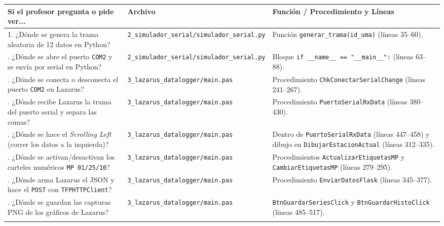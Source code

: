 \documentclass[11pt,a4paper]{article}
\begin{document}
\begin{table}[h!]
\centering
\small
\begin{tabular}{@{}p{5.8cm}p{4.6cm}p{5.2cm}@{}}
\toprule
\textbf{Si el profesor pregunta o pide ver...} & \textbf{Archivo} & \textbf{Función / Procedimiento y Líneas} \\ \midrule
1. ¿Dónde se genera la trama aleatoria de 12 datos en Python? & \texttt{2\_simulador\_serial/\newline simulador\_serial.py} & Función \texttt{generar\_trama(id\_uma)} (líneas 35--60). \\ \addlinespace
2. ¿Dónde se abre el puerto \texttt{COM2} y se envía por serial en Python? & \texttt{2\_simulador\_serial/\newline simulador\_serial.py} & Bloque \texttt{if \_\_name\_\_ == "\_\_main\_\_":} (líneas 63--88). \\ \addlinespace
3. ¿Dónde se conecta o desconecta el puerto \texttt{COM2} en Lazarus? & \texttt{3\_lazarus\_datalogger/\newline main.pas} & Procedimiento \texttt{ChkConectarSerialChange} (líneas 241--267). \\ \addlinespace
4. ¿Dónde recibe Lazarus la trama del puerto serial y separa las comas? & \texttt{3\_lazarus\_datalogger/\newline main.pas} & Procedimiento \texttt{PuertoSerialRxData} (líneas 380--430). \\ \addlinespace
5. ¿Dónde se hace el \emph{Scrolling Left} (correr los datos a la izquierda)? & \texttt{3\_lazarus\_datalogger/\newline main.pas} & Dentro de \texttt{PuertoSerialRxData} (líneas 447--458) y dibujo en \texttt{DibujarEstacionActual} (líneas 312--335). \\ \addlinespace
6. ¿Dónde se activan/desactivan los carteles numéricos \texttt{MP 01/25/10}? & \texttt{3\_lazarus\_datalogger/\newline main.pas} & Procedimientos \texttt{ActualizarEtiquetasMP} y \texttt{CambiarEtiquetasMP} (líneas 279--295). \\ \addlinespace
7. ¿Dónde arma Lazarus el JSON y hace el \texttt{POST} con \texttt{TFPHTTPClient}? & \texttt{3\_lazarus\_datalogger/\newline main.pas} & Procedimiento \texttt{EnviarDatosFlask} (líneas 345--377). \\ \addlinespace
8. ¿Dónde se guardan las capturas PNG de los gráficos de Lazarus? & \texttt{3\_lazarus\_datalogger/\newline main.pas} & \texttt{BtnGuardarSeriesClick} y \texttt{BtnGuardarHistoClick} (líneas 485--517). \\ \addlinespace

\end{tabular}
\end{table}
\end{document}
